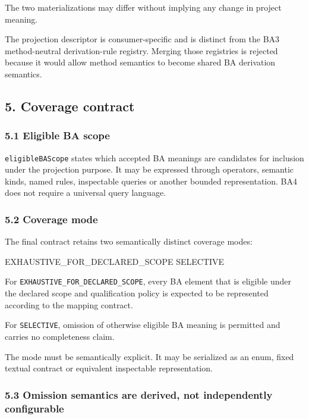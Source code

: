 \documentclass[
  11pt,
  a4paper,
]{article}
\newenvironment{Shaded}{}{}
\newcommand{\NormalTok}[1]{#1}
\begin{document}
The two materializations may differ without implying any change in
project meaning.

The projection descriptor is consumer-specific and is distinct from the
BA3 method-neutral derivation-rule registry. Merging those registries is
rejected because it would allow method semantics to become shared BA
derivation semantics.

\subsection{5. Coverage contract}\label{coverage-contract}

\subsubsection{5.1 Eligible BA scope}\label{eligible-ba-scope}

\texttt{eligibleBAScope} states which accepted BA meanings are
candidates for inclusion under the projection purpose. It may be
expressed through operators, semantic kinds, named rules, inspectable
queries or another bounded representation. BA4 does not require a
universal query language.

\subsubsection{5.2 Coverage mode}\label{coverage-mode}

The final contract retains two semantically distinct coverage modes:

\begin{Shaded}
\begin{Highlighting}[]
\NormalTok{EXHAUSTIVE\_FOR\_DECLARED\_SCOPE}
\NormalTok{SELECTIVE}
\end{Highlighting}
\end{Shaded}

For \texttt{EXHAUSTIVE\_FOR\_DECLARED\_SCOPE}, every BA element that is
eligible under the declared scope and qualification policy is expected
to be represented according to the mapping contract.

For \texttt{SELECTIVE}, omission of otherwise eligible BA meaning is
permitted and carries no completeness claim.

The mode must be semantically explicit. It may be serialized as an enum,
fixed textual contract or equivalent inspectable representation.

\subsubsection{5.3 Omission semantics are derived, not independently
configurable}\label{omission-semantics-are-derived-not-independently-configurable}
\end{document}
